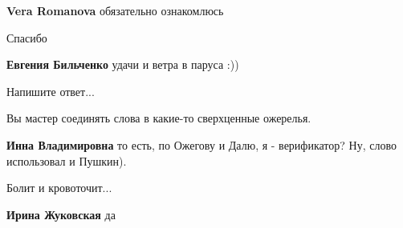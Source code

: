 \begin{itemize}
\textbf{Vera Romanova} обязательно ознакомлюсь

Спасибо

\textbf{Евгения Бильченко} удачи и ветра в паруса :))

Напишите ответ...

Вы мастер соединять слова в какие-то сверхценные ожерелья.

\textbf{Инна Владимировна} то есть, по Ожегову и Далю, я - верификатор? Ну, слово использовал и Пушкин).


Болит и кровоточит...

\textbf{Ирина Жуковская} да



\end{itemize}

